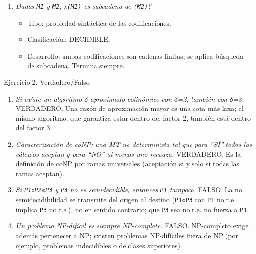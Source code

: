 \documentclass[12pt]{book} %
\providecommand{\tightlist}{%
  \setlength{\itemsep}{0pt}\setlength{\parskip}{0pt}}
\begin{document}
\begin{enumerate}
  \begin{itemize}
  \tightlist
  \item
    Tipo: comportamiento sobre la entrada fija \texttt{λ}.
  \item
    Clasificación: NO SEMIDECIDIBLE.
  \item
    Desarrollo: los programas Post-Turing son equivalentes a las MT, por
    lo que ``P no acepta \texttt{λ}'' es C-UNIVERSAL con \texttt{w=λ},
    que no es r.e.
  \end{itemize}
\item
  \emph{Dadas \texttt{M1} y \texttt{M2}, ¿\texttt{⟨M1⟩} es subcadena de
  \texttt{⟨M2⟩}?}

  \begin{itemize}
  \tightlist
  \item
    Tipo: propiedad sintáctica de las codificaciones.
  \item
    Clasificación: DECIDIBLE.
  \item
    Desarrollo: ambas codificaciones son cadenas finitas; se aplica
    búsqueda de subcadena. Termina siempre.
  \end{itemize}
\end{enumerate}

Ejercicio 2. Verdadero/Falso

\begin{enumerate}
\def\labelenumi{\arabic{enumi}.}
\tightlist
\item
  \emph{Si existe un algoritmo δ-aproximado polinómico con δ=2, también
  con δ=3.} VERDADERO. Una razón de aproximación mayor es una cota más
  laxa; el mismo algoritmo, que garantiza estar dentro del factor 2,
  también está dentro del factor 3.
\item
  \emph{Caracterización de coNP: una MT no determinista tal que para
  ``SÍ'' todos los cálculos aceptan y para ``NO'' al menos uno rechaza.}
  VERDADERO. Es la definición de coNP por ramas universales (aceptación
  si y solo si todas las ramas aceptan).
\item
  \emph{Si \texttt{P1∝P2∝P3} y \texttt{P3} no es semidecidible, entonces
  \texttt{P1} tampoco.} FALSO. La no semidecidibilidad se transmite del
  origen al destino (\texttt{P1∝P3} con \texttt{P1} no r.e. implica
  \texttt{P3} no r.e.), no en sentido contrario; que \texttt{P3} sea no
  r.e. no fuerza a \texttt{P1}.
\item
  \emph{Un problema NP-difícil es siempre NP-completo.} FALSO.
  NP-completo exige además pertenecer a NP; existen problemas
  NP-difíciles fuera de NP (por ejemplo, problemas indecidibles o de
  clases superiores).
\end{enumerate}
\end{document}
